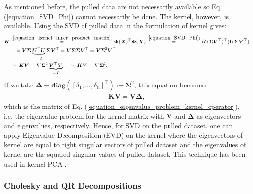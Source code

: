 \documentclass[lang=cn,10pt]{gorgeousnbook}
\numberwithin{equation}{section}%
\numberwithin{figure}{section}%
\begin{document}
As mentioned before, the pulled data are not necessarily available so Eq. (\ref{equation_SVD_Phi}) cannot necessarily be done.
The kernel, however, is available.
Using the SVD of pulled data in the formulation of kernel gives:
\begin{align}
&\boldsymbol{K} \overset{(\ref{equation_kernel_inner_product_matrix})}{=} \boldsymbol{\Phi}(\boldsymbol{X})^\top \boldsymbol{\Phi}(\boldsymbol{X}) \overset{(\ref{equation_SVD_Phi})}{=} (\boldsymbol{U}\boldsymbol{\Sigma}\boldsymbol{V}^\top)^\top (\boldsymbol{U}\boldsymbol{\Sigma}\boldsymbol{V}^\top) \nonumber \\
&~~~~~~ = \boldsymbol{V}\boldsymbol{\Sigma}\underbrace{\boldsymbol{U}^\top \boldsymbol{U}}_{=\,\boldsymbol{I}}\boldsymbol{\Sigma}\boldsymbol{V}^\top 
= \boldsymbol{V}\boldsymbol{\Sigma}\boldsymbol{\Sigma}\boldsymbol{V}^\top = \boldsymbol{V}\boldsymbol{\Sigma}^2\boldsymbol{V}^\top, \nonumber \\
&\implies \boldsymbol{K} \boldsymbol{V} = \boldsymbol{V} \boldsymbol{\Sigma}^2 \underbrace{\boldsymbol{V}^\top \boldsymbol{V}}_{=\,\boldsymbol{I}} \implies \boldsymbol{K} \boldsymbol{V} = \boldsymbol{V} \boldsymbol{\Sigma}^2. \label{equation_eigenvalue_problem_kernel_factorization_Sigma2}
\end{align}
If we take $\boldsymbol{\Delta} = \textbf{diag}([\delta_1, \dots, \delta_n]^\top) := \boldsymbol{\Sigma}^2$, this equation becomes:
\begin{align}\label{equation_eigenvalue_problem_kernel_factorization}
\boldsymbol{K} \boldsymbol{V} = \boldsymbol{V} \boldsymbol{\Delta},
\end{align}
which is the matrix of Eq. (\ref{equation_eigenvalue_problem_kernel_operator}), i.e. the eigenvalue problem \cite{ghojogh2019eigenvalue} for the kernel matrix with $\boldsymbol{V}$ and $\boldsymbol{\Delta}$ as eigenvectors and eigenvalues, respectively.
Hence, for SVD on the pulled dataset, one can apply Eigenvalue Decomposition (EVD) on the kernel where the eigenvectors of kernel are equal to right singular vectors of pulled dataset and the eigenvalues of kernel are the squared singular values of pulled dataset. 
This technique has been used in kernel PCA \cite{ghojogh2019unsupervised}. 

\subsubsection{Cholesky and QR Decompositions}
\end{document}

